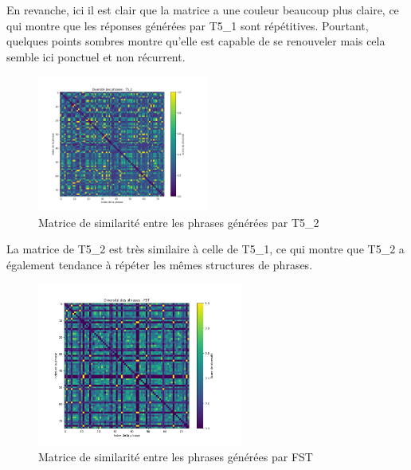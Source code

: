 \documentclass[conference]{IEEEtran}
\begin{document}
\vspace{5mm}

En revanche, ici il est clair que la matrice a une couleur beaucoup plus claire, ce qui montre que les réponses générées par T5\_1 sont répétitives. Pourtant, quelques points sombres montre qu'elle est capable de se renouveler mais cela semble 
ici ponctuel et non récurrent.

\vspace{5mm}

\begin{figure}[H]
\centering
\includegraphics[width=0.5\textwidth]{images/diversity_matrix_t5_2.png}
\caption{Matrice de similarité entre les phrases générées par T5\_2}
\end{figure}

\vspace{5mm}

La matrice de T5\_2 est très similaire à celle de T5\_1, ce qui montre que T5\_2 a également tendance à répéter les mêmes structures de phrases.

\vspace{5mm}

\begin{figure}[H]
\centering
\includegraphics[width=0.6\textwidth]{images/diversity_matrix_FST.png}
\caption{Matrice de similarité entre les phrases générées par FST}
\end{figure}
\end{document}
